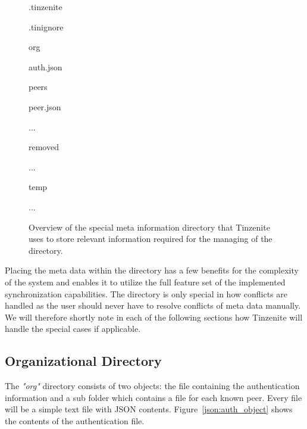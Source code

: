 \begin{figure}[htp]
\begin{modellist}
\item .tinzenite
\begin{modellist}
    \item .tinignore
    \item org
    \begin{modellist}
        \item auth.json
        \item peers
        \begin{modellist}
            \item peer.json
            \item ...
        \end{modellist}
    \end{modellist}
    \item removed
    \begin{modellist}
        \item ...
    \end{modellist}
    \item temp
    \begin{modellist}
        \item ...
    \end{modellist}
\end{modellist}
\end{modellist}
\caption[Meta Folder Structure]{Overview of the special meta information directory that Tinzenite uses to store relevant information required for the managing of the directory.}
\label{list:meta_folder}
\end{figure}

Placing the meta data within the directory has a few benefits for the complexity of the system and enables it to utilize the full feature set of the implemented synchronization capabilities.
The directory is only special in how conflicts are handled as the user should never have to resolve conflicts of meta data manually.
We will therefore shortly note in each of the following sections how Tinzenite will handle the special cases if applicable.

\subsection{Organizational Directory}
\label{sub:Organizational Directory}

The \textit{"org"} directory consists of two objects: the file containing the authentication information and a sub folder which contains a file for each known peer.
Every file will be a simple text file with JSON contents.
Figure~\ref{json:auth_object} shows the contents of the authentication file.

